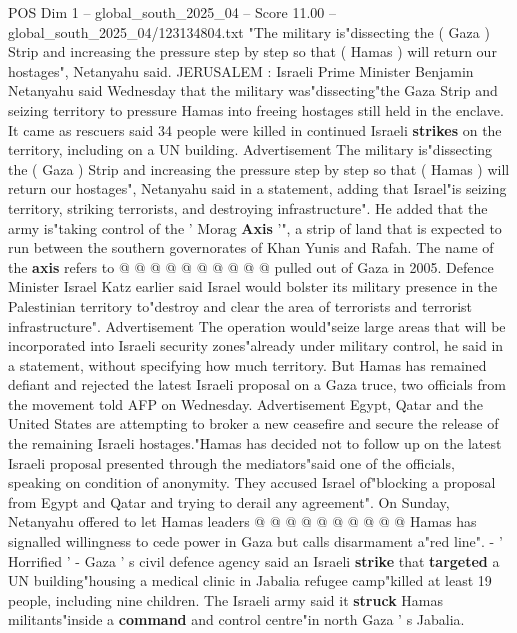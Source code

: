 \begin{textsample}{POS Dim 1 – global\_south\_2025\_04 – Score 11.00 – global\_south\_2025\_04/123134804.txt}  \label{ex:f1_pos_328}
"The military is"dissecting the ( Gaza ) Strip and increasing the pressure step by step so that ( Hamas ) will return our hostages", Netanyahu said.
JERUSALEM : Israeli Prime Minister Benjamin Netanyahu said Wednesday that the military was"dissecting"the Gaza Strip and seizing territory to pressure Hamas into freeing hostages still held in the enclave.
It came as rescuers said 34 people were killed in continued Israeli \textbf{strikes} on the territory, including on a UN building.
Advertisement The military is"dissecting the ( Gaza ) Strip and increasing the pressure step by step so that ( Hamas ) will return our hostages", Netanyahu said in a statement, adding that Israel"is seizing territory, striking terrorists, and destroying infrastructure".
He added that the army is"taking control of the ' Morag \textbf{Axis} '", a strip of land that is expected to run between the southern governorates of Khan Yunis and Rafah.
The name of the \textbf{axis} refers to @ @ @ @ @ @ @ @ @ @ pulled out of Gaza in 2005.
Defence Minister Israel Katz earlier said Israel would bolster its military presence in the Palestinian territory to"destroy and clear the area of terrorists and terrorist infrastructure".
Advertisement The operation would"seize large areas that will be incorporated into Israeli security zones"already under military control, he said in a statement, without specifying how much territory.
But Hamas has remained defiant and rejected the latest Israeli proposal on a Gaza truce, two officials from the movement told AFP on Wednesday.
Advertisement Egypt, Qatar and the United States are attempting to broker a new ceasefire and secure the release of the remaining Israeli hostages."Hamas has decided not to follow up on the latest Israeli proposal presented through the mediators"said one of the officials, speaking on condition of anonymity.
They accused Israel of"blocking a proposal from Egypt and Qatar and trying to derail any agreement".
On Sunday, Netanyahu offered to let Hamas leaders @ @ @ @ @ @ @ @ @ @ Hamas has signalled willingness to cede power in Gaza but calls disarmament a"red line". - ' Horrified ' - Gaza ' s civil defence agency said an Israeli \textbf{strike} that \textbf{targeted} a UN building"housing a medical clinic in Jabalia refugee camp"killed at least 19 people, including nine children.
The Israeli army said it \textbf{struck} Hamas militants"inside a \textbf{command} and control centre"in north Gaza ' s Jabalia.

\end{textsample}
